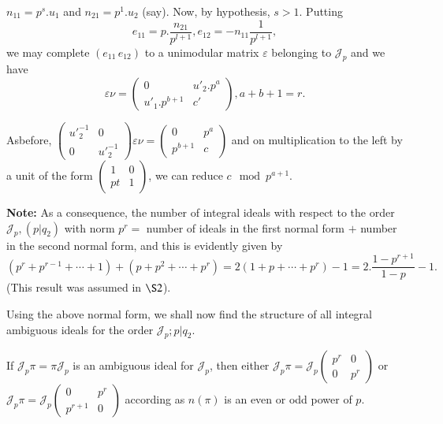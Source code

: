 \begin{case}[(ii) ]\label{chap4:sec9:case2}%
  $n_{11} = p^s.  u_1$ and $n_{21} = p^1.  u_2$ (say). Now, by
  hypothesis, $s > 1$. Putting 
  $$ 
  e_{11} = p.  \frac{n_{21}}{p^{l+1}},  e_{12} = - n_{11} \frac{1}{p^{l+1}},
  $$
  we may complete $(e_{11}\, e_{12})$ to a unimodular matrix
  $\varepsilon$ belonging to $\mathcal{J}_p$ and we have 
  $$
  \varepsilon \nu =  \begin{pmatrix} 0 & u'_2.  p^a \\ u'_1.  p^{b +
      1} & c' \end{pmatrix},  a + b + 1 = r. 
  $$
\end{case}

As\pageoriginale before, $\begin{pmatrix}  u'^{- 1}_2 & 0  \\ 0 &
  u'^{-1}_2 \end{pmatrix} \varepsilon \nu = \begin{pmatrix} 0 & p^a
  \\  p^{b + 1} & c \end{pmatrix} $  and on multiplication to the left
by a unit of the form $\begin{pmatrix} 1& 0 \\ pt & 1 \end{pmatrix}$,
we can reduce $c \mod p^{a + 1}$. 

\noindent \textbf{Note:}
  As a consequence, the number of integral ideals with respect to the
  order $\mathcal{J}_p, (p | q_2)$ with norm $p^r = $ number of ideals
  in the first normal form $+$ number in the second normal form, and
  this is evidently given by 
{\fontsize{10pt}{12pt}\selectfont
  $$
  (p^r + p^{r - 1} + \cdots + 1) + ( p + p^2 + \cdots + p^r) = 2 (1 +
  p + \cdots + p^r) - 1 = 2.  \frac{1 - p^{r+ 1}} {1 - p} -1. 
  $$}\relax
(This result was assumed in $\S 2$).

Using the above normal form, we shall now find the structure of all
integral ambiguous ideals for the order $\mathcal{J}_p ; p | q_2$. 
\begin{theorem}\label{chap4:sec9:thm2}%
  If $\mathcal{J}_p \pi = \pi \mathcal{J}_p$ is an ambiguous
    ideal for $\mathcal{J}_p$, then either $\mathcal{J}_p \pi =
    \mathcal{J}_p \begin{pmatrix} p^r & 0 \\ 0 & p^r \end{pmatrix}$ or
    $\mathcal{J}_p \pi = \mathcal{J}_p \begin{pmatrix} 0 &  p^r
      \\ p^{r + 1} & 0 \end{pmatrix} $ according as $n (\pi)$ is an
    even or odd power of $p$. 
\end{theorem}

